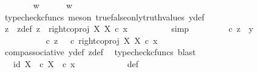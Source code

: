 \begin{isabellebody}
\isanewline
\ \ \ \ \ \ \isamarkupfalse%
\ {\isachardoublequoteopen}w\ {\isasymnoteq}\ {\isasymt}{\isachardoublequoteclose}\ \isamarkupfalse%
\ \isamarkupfalse%
\ {\isachardoublequoteopen}w\ {\isacharequal}{\kern0pt}\ {\isasymf}{\isachardoublequoteclose}\ \ \isanewline
\ \ \ \ \ \ \ \ \isamarkupfalse%
\ {\isacharparenleft}{\kern0pt}typecheck{\isacharunderscore}{\kern0pt}cfuncs{\isacharcomma}{\kern0pt}\ meson\ true{\isacharunderscore}{\kern0pt}false{\isacharunderscore}{\kern0pt}only{\isacharunderscore}{\kern0pt}truth{\isacharunderscore}{\kern0pt}values\ y{\isacharunderscore}{\kern0pt}def{\isacharparenright}{\kern0pt}\isanewline
\ \ \ \ \ \ \isamarkupfalse%
\ z\ \ z{\isacharunderscore}{\kern0pt}def{\isacharcolon}{\kern0pt}\ {\isachardoublequoteopen}z\ {\isacharequal}{\kern0pt}\ right{\isacharunderscore}{\kern0pt}coproj\ X\ X\ {\isasymcirc}\isactrlsub c\ x{\isachardoublequoteclose}\isanewline
\ \ \ \ \ \ \ \ \isamarkupfalse%
\ simp\isanewline
\ \ \ \ \ \ \isamarkupfalse%
\ {\isachardoublequoteopen}{\isasymrho}\ {\isasymcirc}\isactrlsub c\ z\ {\isacharequal}{\kern0pt}\ y{\isachardoublequoteclose}\isanewline
\ \ \ \ \ \ \isamarkupfalse%
\ {\isacharminus}{\kern0pt}\ \isanewline
\ \ \ \ \ \ \ \ \isamarkupfalse%
\ {\isachardoublequoteopen}{\isasymrho}\ {\isasymcirc}\isactrlsub c\ z\ {\isacharequal}{\kern0pt}\ {\isacharparenleft}{\kern0pt}{\isasymrho}\ {\isasymcirc}\isactrlsub c\ right{\isacharunderscore}{\kern0pt}coproj\ X\ X{\isacharparenright}{\kern0pt}\ {\isasymcirc}\isactrlsub c\ x{\isachardoublequoteclose}\isanewline
\ \ \ \ \ \ \ \ \ \ \isamarkupfalse%
\ comp{\isacharunderscore}{\kern0pt}associative{}\ y{\isacharunderscore}{\kern0pt}def\ z{\isacharunderscore}{\kern0pt}def\ \isamarkupfalse%
\ {\isacharparenleft}{\kern0pt}typecheck{\isacharunderscore}{\kern0pt}cfuncs{\isacharcomma}{\kern0pt}\ blast{\isacharparenright}{\kern0pt}\isanewline
\ \ \ \ \ \ \ \ \isamarkupfalse%
\ \isamarkupfalse%
\ {\isachardoublequoteopen}{\isachardot}{\kern0pt}{\isachardot}{\kern0pt}{\isachardot}{\kern0pt}\ {\isacharequal}{\kern0pt}\ {\isasymlangle}id\ X{\isacharcomma}{\kern0pt}\ {\isasymf}\ {\isasymcirc}\isactrlsub c\ {\isasymbeta}\isactrlbsub X\isactrlesub {\isasymrangle}\ \ {\isasymcirc}\isactrlsub c\ x{\isachardoublequoteclose}\isanewline
\ \ \ \ \ \ \ \ \ \ \isamarkupfalse%
\ {\isasymrho}{\isacharunderscore}{\kern0pt}def\ \ \isamarkupfalse%

\end{isabellebody}
